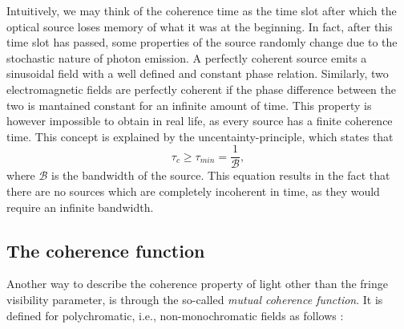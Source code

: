 Intuitively, we may think of the coherence time as the time slot after which the optical source loses memory of what it was at the beginning. In fact, after this time slot has passed, some properties of the source randomly change due to the stochastic nature of photon emission. A perfectly coherent source emits a sinusoidal field with a well defined and constant phase relation. Similarly, two electromagnetic fields are perfectly coherent if the phase difference between the two is mantained constant for an infinite amount of time. This property is however impossible to obtain in real life, as every source has a finite coherence time. This concept is explained by the uncentainty-principle, which states that 
\begin{equation}
	\tau_c \geq \tau_{min} = \frac{1}{\mathcal{B}},
\end{equation}
where $\mathcal{B}$ is the bandwidth of the source. This equation results in the fact that there are no sources which are completely incoherent in time, as they would require an infinite bandwidth.

\subsection{The coherence function}
Another way to describe the coherence property of light other than the fringe visibility parameter, is through the so-called \emph{mutual coherence function}. It is defined for polychromatic, i.e., non-monochromatic fields as follows \cite{Wolf1999}:

